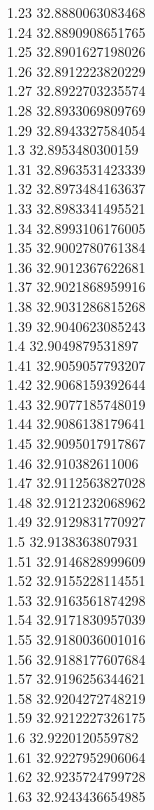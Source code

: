 {1.23	32.8880063083468\\
1.24	32.8890908651765\\
1.25	32.8901627198026\\
1.26	32.8912223820229\\
1.27	32.8922703235574\\
1.28	32.8933069809769\\
1.29	32.8943327584054\\
1.3	32.8953480300159\\
1.31	32.8963531423339\\
1.32	32.8973484163637\\
1.33	32.8983341495521\\
1.34	32.8993106176005\\
1.35	32.9002780761384\\
1.36	32.9012367622681\\
1.37	32.9021868959916\\
1.38	32.9031286815268\\
1.39	32.9040623085243\\
1.4	32.9049879531897\\
1.41	32.9059057793207\\
1.42	32.9068159392644\\
1.43	32.9077185748019\\
1.44	32.9086138179641\\
1.45	32.9095017917867\\
1.46	32.910382611006\\
1.47	32.9112563827028\\
1.48	32.9121232068962\\
1.49	32.9129831770927\\
1.5	32.9138363807931\\
1.51	32.9146828999609\\
1.52	32.9155228114551\\
1.53	32.9163561874298\\
1.54	32.9171830957039\\
1.55	32.9180036001016\\
1.56	32.9188177607684\\
1.57	32.9196256344621\\
1.58	32.9204272748219\\
1.59	32.9212227326175\\
1.6	32.9220120559782\\
1.61	32.9227952906064\\
1.62	32.9235724799728\\
1.63	32.9243436654985\\
}
